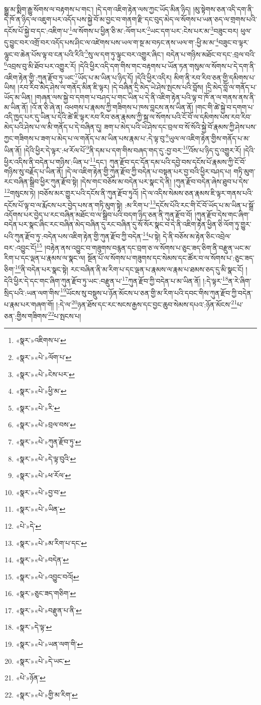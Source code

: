 སྒྱུ་མ་སྨིག་རྒྱུ་སོགས་ལ་བརྟགས་པ་གང་། །དེ་དག་འཇིག་རྟེན་ལས་ཀྱང་ཡོད་མིན་ཉིད། །མུ་སྟེགས་ཅན་འདི་དག་ནི་དེ་ཁོ་ན་ཉིད་ལ་འཇུག་པར་འདོད་པས་སྐྱེ་བོ་མ་བྱང་བ་གནག་རྫི་དང་བུད་མེད་ལ་སོགས་པ་ཡན་ཅད་ལ་གྲགས་པའི་དངོས་པོ་སྐྱེ་བ་དང་:འཇིག་པ་\footnote{«སྣར་»འཇིགས་པ་}ལ་སོགས་པ་ཕྱིན་ཅི་མ་:ལོག་པར་\footnote{«སྣར་»«པེ་»ལོག་པ་}ཡང་དག་པར་:ངེས་པར་མ་\footnote{«སྣར་»«པེ་»ངེས་པར་}བཟུང་བར། ཕུལ་དུ་བྱུང་བར་འགྲོ་བར་འདོད་པས་ཤིང་ལ་འཛེགས་པས་ཡལ་ག་སྔ་མ་བཏང་ནས་ཡལ་ག་:ཕྱི་མ་མ་\footnote{«སྣར་»«པེ་»ཕྱི་མ་}བཟུང་བ་ལྟར་ལྷུང་བ་ཆེན་པོས་ལྟ་བ་ངན་པའི་རིའི་\footnote{«སྣར་»«པེ་»རི་}སུ་ལ་དག་ཏུ་ལྟུང་བར་འགྱུར་ཞིང་། བདེན་པ་གཉིས་མཐོང་བ་དང་:བྲལ་བའི་\footnote{«སྣར་»«པེ་»བྲལ་བས་}འབྲས་བུ་མི་ཐོབ་པར་འགྱུར་རོ། །དེའི་ཕྱིར་འདི་དག་གིས་གང་བརྟགས་པ་ཡོན་ཏན་གསུམ་ལ་སོགས་པ་དེ་དག་ནི་འཇིག་རྟེན་གྱི་:ཀུན་རྫོབ་ཏུ་ཡང་\footnote{«སྣར་»«པེ་»ཀུན་རྫོབ་ཏུ་}ཡོད་པ་མ་ཡིན་པ་ཉིད་དོ། །དེའི་ཕྱིར་འདིར། མིག་ནི་རབ་རིབ་ཅན་གྱི་དམིགས་པ་ཡིས། །རབ་རིབ་མེད་ཤེས་ལ་གནོད་མིན་ཇི་ལྟར། །དེ་བཞིན་དྲི་མེད་ཡེ་ཤེས་སྤངས་པའི་བློས། །དྲི་མེད་བློ་ལ་གནོད་པ་ཡོད་མ་ཡིན། །གཞན་ལས་སྐྱེ་བ་དགག་པ་བཤད་པ་གང་ཡིན་པ་དེ་ནི་འཇིག་རྟེན་པའི་ལྟ་བ་ཁོ་ན་ལ་གནས་ནས་ནི་མ་ཡིན་ནོ། །འོ་ན་ཅི་ཞེ་ན། འཕགས་པ་རྣམས་ཀྱི་གཟིགས་པ་ཁས་བླངས་ནས་ཡིན་ནོ། །གང་གི་ཚེ་སྐྱེ་བ་དགག་པ་འདི་ཁྱད་པར་དུ་ཡིན་པ་དེའི་ཚེ་ཇི་ལྟར་རབ་རིབ་ཅན་རྣམས་ཀྱི་སྐྲ་ལ་སོགས་པའི་ངོ་བོ་ལ་དམིགས་པས་རབ་རིབ་མེད་པའི་ཤེས་པ་ལ་མི་གནོད་པ་དེ་བཞིན་དུ། ཟག་པ་མེད་པའི་ཡེ་ཤེས་དང་བྲལ་བ་སོ་སོའི་སྐྱེ་བོ་རྣམས་ཀྱི་ཤེས་པས་ཀྱང་གཟིགས་པ་ཟག་པ་མེད་པ་ལ་གནོད་པ་མ་ཡིན་པས་རྣམ་པ་:དེ་ལྟ་བུ་\footnote{«སྣར་»«པེ་»དེ་ལྟ་བུའི་}ཡུལ་ལ་འཇིག་རྟེན་གྱིས་གནོད་པ་མ་ཡིན་ནོ། །དེའི་ཕྱིར་དེ་ལྟར་:ཕ་རོལ་པོ་\footnote{«སྣར་»«པེ་»ཕ་རོལ་}ནི་དམ་པ་དག་གིས་བཞད་གད་དུ་:བྱ་བར་\footnote{«སྣར་»«པེ་»བྱ་བ་}འོས་པ་ཉིད་དུ་འགྱུར་རོ། །དེའི་ཕྱིར་འདིས་ནི་བདེན་པ་གཉིས་:ཡིན་པ་\footnote{«སྣར་»«པེ་»ཡིན་}དང་། ཀུན་རྫོབ་དང་དོན་དམ་པའི་དབྱེ་བས་དངོས་པོ་རྣམས་ཀྱི་ངོ་བོ་གཉིས་སུ་བརྗོད་པ་ཡིན་ནོ། །དེ་ལ་འཇིག་རྟེན་གྱི་ཀུན་རྫོབ་ཀྱི་བདེན་པ་བསྟན་པར་བྱ་བའི་ཕྱིར་བཤད་པ། གཏི་མུག་རང་བཞིན་སྒྲིབ་ཕྱིར་ཀུན་རྫོབ་སྟེ། །དེས་གང་བཅོས་མ་བདེན་པར་སྣང་དེ་ནི། །ཀུན་རྫོབ་བདེན་ཞེས་ཐུབ་པ་དེས་\footnote{«པེ་»དེ་}གསུངས་ཏེ། །བཅོས་མར་གྱུར་པའི་དངོས་ནི་ཀུན་རྫོབ་ཏུའོ། །དེ་ལ་འདིས་སེམས་ཅན་རྣམས་ཇི་ལྟར་གནས་པའི་དངོས་པོ་ལྟ་བ་ལ་རྨོངས་པར་བྱེད་པས་ན་གཏི་མུག་སྟེ། :མ་རིག་པ་\footnote{«སྣར་»«པེ་»མ་རིག་པ་དང་}དངོས་པོའི་རང་གི་ངོ་བོ་ཡོད་པ་མ་ཡིན་པ་སྒྲོ་འདོགས་པར་བྱེད་པ་རང་བཞིན་མཐོང་བ་ལ་སྒྲིབ་པའི་བདག་ཉིད་ཅན་ནི་ཀུན་རྫོབ་བོ། །ཀུན་རྫོབ་དེས་གང་ཞིག་བདེན་པར་སྣང་ཞིང་རང་བཞིན་མེད་བཞིན་དུ་རང་བཞིན་དུ་སོ་སོར་སྣང་བ་དེ་ནི་འཇིག་རྟེན་ཕྱིན་ཅི་ལོག་ཏུ་གྱུར་པའི་ཀུན་རྫོབ་ཏུ་:བདེན་པས་འཇིག་རྟེན་གྱི་ཀུན་རྫོབ་ཀྱི་བདེན་\footnote{«སྣར་»«པེ་»བདེན་}པ་སྟེ། དེ་ནི་བཅོས་མ་རྟེན་ཅིང་འབྲེལ་བར་:འབྱུང་ངོ།\footnote{«སྣར་»«པེ་»འབྱུང་བའོ།} །བརྟེན་ནས་འབྱུང་བ་གཟུགས་བརྙན་དང་བྲག་ཅ་ལ་སོགས་པ་ཅུང་ཟད་ཅིག་ནི་བརྫུན་ཡང་མ་རིག་པ་དང་ལྡན་པ་རྣམས་ལ་སྣང་ལ། སྔོན་པོ་ལ་སོགས་པ་གཟུགས་དང་སེམས་དང་ཚོར་བ་ལ་སོགས་པ་:ཅུང་ཟད་ཅིག་\footnote{«སྣར་»ཅུང་ཟད་གཅིག་}ནི་བདེན་པར་སྣང་སྟེ། རང་བཞིན་ནི་མ་རིག་པ་དང་ལྡན་པ་རྣམས་ལ་རྣམ་པ་ཐམས་ཅད་དུ་མི་སྣང་ངོ། །དེའི་ཕྱིར་དེ་དང་གང་ཞིག་ཀུན་རྫོབ་ཏུ་ཡང་:བརྫུན་པ་\footnote{«སྣར་»«པེ་»བརྫུན་པ་ནི་}ཀུན་རྫོབ་ཀྱི་བདེན་པ་མ་ཡིན་ནོ། །:དེ་ལྟར་\footnote{«སྣར་»དེ་ལྟ་}ན་རེ་ཞིག་སྲིད་པའི་:ཡན་ལག་གིས་\footnote{«སྣར་»«པེ་»ཡན་ལག་གི་}ཡོངས་སུ་བསྡུས་པ་ཉོན་མོངས་པ་ཅན་གྱི་མ་རིག་པའི་དབང་གིས་ཀུན་རྫོབ་ཀྱི་བདེན་པ་རྣམ་པར་གཞག་གོ། །:དེ་ལ་\footnote{«སྣར་»«པེ་»དེ་ཡང་}ཉན་ཐོས་དང་རང་སངས་རྒྱས་དང་བྱང་ཆུབ་སེམས་དཔའ་:ཉོན་མོངས་\footnote{«པེ་»ཉོན་}པ་ཅན་:གྱིས་གཟིགས་\footnote{«སྣར་»«པེ་»གྱི་མ་རིག་}པ་སྤངས་པ། 